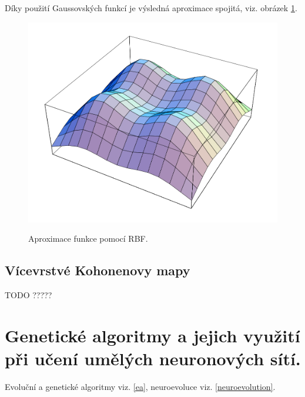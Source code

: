 \documentclass[11pt]{report} %
\numberwithin{equation}{section}
\begin{document}
Díky použití Gaussovských funkcí je výsledná aproximace spojitá, viz. obrázek \ref{rbf_gauss}.
\begin{figure}[h]
	\centering
	\includegraphics[scale=0.7]{img/rbf_2.png}
	\label{rbf_gauss}
	\caption{Aproximace funkce pomocí RBF.}
\end{figure}

\subsection{Vícevrstvé Kohonenovy mapy}

TODO ?????


\section{Genetické algoritmy a jejich využití při učení umělých neuronových sítí.}
Evoluční a genetické algoritmy viz. \ref{ea}, neuroevoluce viz. \ref{neuroevolution}.
\end{document}
